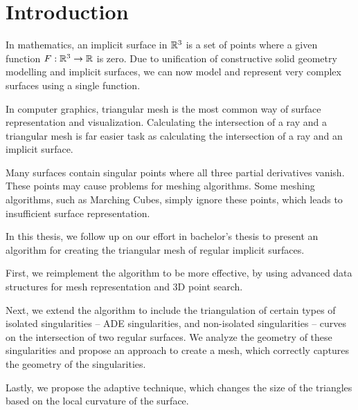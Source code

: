 \chapter*{Introduction} %

In mathematics, an implicit surface in $\mathbb{R}^3$ is a set of points where
a given function $F:\mathbb{R}^3 \to \mathbb{R}$ is zero. Due to
unification of constructive solid geometry modelling and 
implicit surfaces, we can now model and represent very 
complex surfaces using a single function.

In computer graphics, triangular mesh is the most common
way of surface representation and visualization. Calculating
the intersection of a ray and a triangular mesh is far 
easier task as calculating the intersection of a ray and
an implicit surface.

Many surfaces contain singular points where all three partial
derivatives vanish. These points may cause problems for
meshing algorithms. Some meshing algorithms, such as 
Marching Cubes, simply ignore these points,
which leads to insufficient surface representation.

In this thesis, we follow up on our effort in bachelor's thesis
\cite{korecova2021triangulation} to present an algorithm for
creating the triangular mesh of regular implicit surfaces.

First, we reimplement the algorithm to be more effective,
by using advanced data structures for mesh representation 
and 3D point search.

Next, we extend the algorithm to include the triangulation
of certain types of isolated singularities -- ADE singularities,
and non-isolated singularities -- curves on the intersection
of two regular surfaces.
We analyze the geometry of these singularities and propose 
an approach to create a mesh, which correctly captures
the geometry of the singularities.

Lastly, we propose the adaptive technique, which changes the
size of the triangles based on the local curvature of the surface.
